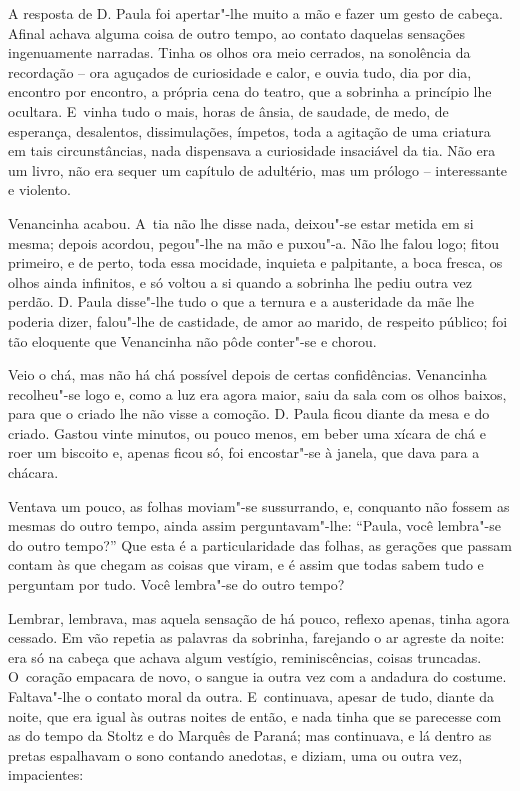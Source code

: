 A resposta de D. Paula foi apertar"-lhe muito a mão e fazer um gesto de
cabeça. Afinal achava alguma coisa de outro tempo, ao contato daquelas
sensações ingenuamente narradas. Tinha os olhos ora meio cerrados, na
sonolência da recordação -- ora aguçados de curiosidade e calor, e ouvia
tudo, dia por dia, encontro por encontro, a própria cena do teatro, que
a sobrinha a princípio lhe ocultara. E~vinha tudo o mais, horas de
ânsia, de saudade, de medo, de esperança, desalentos, dissimulações,
ímpetos, toda a agitação de uma criatura em tais circunstâncias, nada
dispensava a curiosidade insaciável da tia. Não era um livro, não era
sequer um capítulo de adultério, mas um prólogo -- interessante e
violento.

Venancinha acabou. A~tia não lhe disse nada, deixou"-se estar metida em
si mesma; depois acordou, pegou"-lhe na mão e puxou"-a. Não lhe falou
logo; fitou primeiro, e de perto, toda essa mocidade, inquieta e
palpitante, a boca fresca, os olhos ainda infinitos, e só voltou a si
quando a sobrinha lhe pediu outra vez perdão. D. Paula disse"-lhe tudo o
que a ternura e a austeridade da mãe lhe poderia dizer, falou"-lhe de
castidade, de amor ao marido, de respeito público; foi tão eloquente que
Venancinha não pôde conter"-se e chorou.

Veio o chá, mas não há chá possível depois de certas confidências.
Venancinha recolheu"-se logo e, como a luz era agora maior, saiu da sala
com os olhos baixos, para que o criado lhe não visse a comoção. D. Paula
ficou diante da mesa e do criado. Gastou vinte minutos, ou pouco menos,
em beber uma xícara de chá e roer um biscoito e, apenas ficou só, foi
encostar"-se à janela, que dava para a chácara.

Ventava um pouco, as folhas moviam"-se sussurrando, e, conquanto não
fossem as mesmas do outro tempo, ainda assim perguntavam"-lhe: ``Paula,
você lembra"-se do outro tempo?'' Que esta é a particularidade das
folhas, as gerações que passam contam às que chegam as coisas que viram,
e é assim que todas sabem tudo e perguntam por tudo. Você lembra"-se do
outro tempo?

Lembrar, lembrava, mas aquela sensação de há pouco, reflexo apenas,
tinha agora cessado. Em vão repetia as palavras da sobrinha, farejando o
ar agreste da noite: era só na cabeça que achava algum vestígio,
reminiscências, coisas truncadas. O~coração empacara de novo, o sangue
ia outra vez com a andadura do costume. Faltava"-lhe o contato moral da
outra. E~continuava, apesar de tudo, diante da noite, que era igual às
outras noites de então, e nada tinha que se parecesse com as do tempo da
Stoltz e do Marquês de Paraná; mas continuava, e lá dentro as pretas
espalhavam o sono contando anedotas, e diziam, uma ou outra vez,
impacientes:


